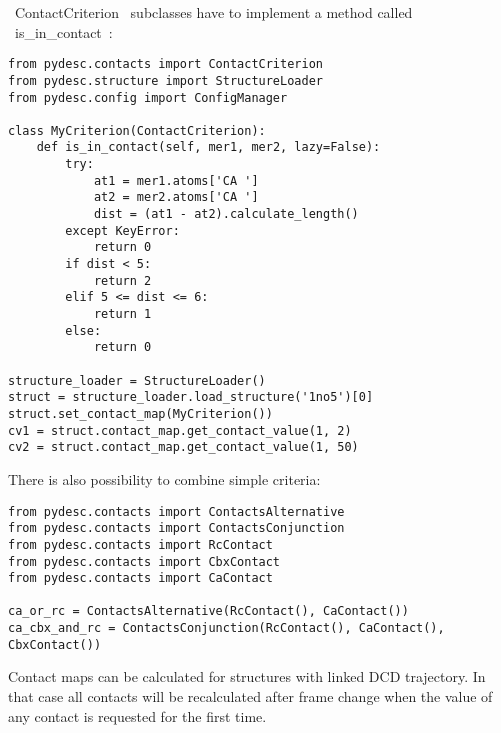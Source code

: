 \documentclass[a4paper,10pt]{article}
\begin{document}
~ContactCriterion~ subclasses have to implement a method called ~is_in_contact~:

\begin{lstlisting}
from pydesc.contacts import ContactCriterion
from pydesc.structure import StructureLoader
from pydesc.config import ConfigManager

class MyCriterion(ContactCriterion):
	def is_in_contact(self, mer1, mer2, lazy=False):
		try:
			at1 = mer1.atoms['CA ']
			at2 = mer2.atoms['CA ']
			dist = (at1 - at2).calculate_length()
		except KeyError:
			return 0
		if dist < 5:
			return 2
		elif 5 <= dist <= 6:
			return 1
		else:
			return 0

structure_loader = StructureLoader()
struct = structure_loader.load_structure('1no5')[0]
struct.set_contact_map(MyCriterion())
cv1 = struct.contact_map.get_contact_value(1, 2)
cv2 = struct.contact_map.get_contact_value(1, 50)
\end{lstlisting}

There is also possibility to combine simple criteria:

\begin{lstlisting}
from pydesc.contacts import ContactsAlternative
from pydesc.contacts import ContactsConjunction
from pydesc.contacts import RcContact
from pydesc.contacts import CbxContact
from pydesc.contacts import CaContact

ca_or_rc = ContactsAlternative(RcContact(), CaContact())
ca_cbx_and_rc = ContactsConjunction(RcContact(), CaContact(), CbxContact())
\end{lstlisting}

Contact maps can be calculated for structures with linked DCD trajectory. In that case all contacts will be recalculated after frame change when the value of any contact is requested for the first time.
\end{document}
